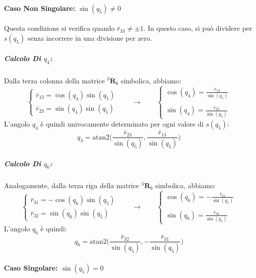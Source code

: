 \documentclass[11pt, a4paper]{report}
\begin{document}
\paragraph{Caso Non Singolare: $\sin(q_5) \neq 0$}
Questa condizione si verifica quando $\bar{r}_{33} \neq \pm 1$. In questo caso, si può dividere per $s(q_5)$ senza incorrere in una divisione per zero.

\subparagraph{Calcolo Di \(q_4\):}
Dalla terza colonna della matrice ${}^{3}\mathbf{R}_{6}$ simbolica, abbiamo:
\[
    \begin{cases}
        \bar{r}_{13} = \cos(q_{4})\sin(q_{5}) \\
        \bar{r}_{23} = \sin(q_{4})\sin(q_{5})
    \end{cases}
    \qquad\longrightarrow\qquad
    \begin{cases}
        \cos(q_{4}) = \displaystyle{\frac{\bar{r}_{13}}{\sin(q_5)}} \\
        \\
        \sin(q_{4}) = \displaystyle{\frac{\bar{r}_{23}}{\sin(q_5)}}
    \end{cases}
\]
L'angolo $q_{4}$ è quindi univocamente determinato per ogni valore di $s(q_5)$:
\begin{equation}
    \boxed{q_4 = \text{atan2}\biggl( \frac{\bar{r}_{23}}{\sin(q_5)}, \frac{\bar{r}_{13}}{\sin(q_5)} \biggr)}
\end{equation}

\subparagraph{Calcolo Di \(q_6\):}
Analogamente, dalla terza riga della matrice ${}^{3}\mathbf{R}_{6}$ simbolica, abbiamo:
\[
    \begin{cases}
        \bar{r}_{31} = -\cos(q_6)\sin(q_5) \\
        \bar{r}_{32} = \sin(q_6)\sin(q_5)
    \end{cases}
    \qquad\longrightarrow\qquad
    \begin{cases}
        \cos(q_{6}) = \displaystyle{-\frac{\bar{r}_{31}}{\sin(q_5)}} \\
        \\
        \sin(q_{6}) = \displaystyle{\frac{\bar{r}_{32}}{\sin(q_5)}}
    \end{cases}
\]
L'angolo $q_{6}$ è quindi:
\begin{equation}
    \boxed{q_6 = \text{atan2}\biggl( \frac{\bar{r}_{32}}{\sin(q_5)}, -\frac{\bar{r}_{31}}{\sin(q_5)} \biggr)}
\end{equation}

\paragraph{Caso Singolare: $\sin(q_5) = 0$}
\end{document}
